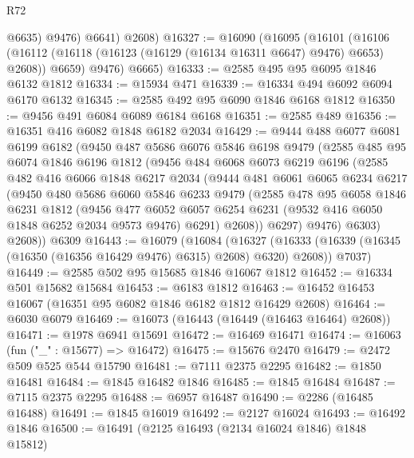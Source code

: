 \begin{lexlean}{R72}
\begin{coremodule}
            @6635)
          @9476)
        @6641)
      @2608)
@16327 := @16090
    (@16095
      (@16101
        (@16106 (@16112 (@16118 (@16123 (@16129 (@16134 @16311 @6647) @9476) @6653) @2608)) @6659)
        @9476)
      @6665)
@16333 := @2585 @495 @95 @6095 @1846 @6132 @1812
@16334 := @15934 @471
@16339 := @16334 @494 @6092 @6094 @6170 @6132
@16345 := @2585 @492 @95 @6090 @1846 @6168 @1812
@16350 := @9456 @491 @6084 @6089 @6184 @6168
@16351 := @2585 @489
@16356 := @16351 @416 @6082 @1848 @6182 @2034
@16429 := @9444
    @488
    @6077
    @6081
    @6199
    @6182
    (@9450
      @487
      @5686
      @6076
      @5846
      @6198
      @9479
      (@2585
        @485
        @95
        @6074
        @1846
        @6196
        @1812
        (@9456
          @484
          @6068
          @6073
          @6219
          @6196
          (@2585
            @482
            @416
            @6066
            @1848
            @6217
            @2034
            (@9444
              @481
              @6061
              @6065
              @6234
              @6217
              (@9450
                @480
                @5686
                @6060
                @5846
                @6233
                @9479
                (@2585
                  @478
                  @95
                  @6058
                  @1846
                  @6231
                  @1812
                  (@9456
                    @477
                    @6052
                    @6057
                    @6254
                    @6231
                    (@9532 @416 @6050 @1848 @6252 @2034 @9573 @9476)
                    @6291)
                  @2608))
              @6297)
            @9476)
          @6303)
        @2608))
    @6309
@16443 := @16079
    (@16084
      (@16327 (@16333 (@16339 (@16345 (@16350 (@16356 @16429 @9476) @6315) @2608) @6320) @2608))
      @7037)
@16449 := @2585 @502 @95 @15685 @1846 @16067 @1812
@16452 := @16334 @501 @15682 @15684
@16453 := @6183 @1812
@16463 := @16452 @16453 @16067 (@16351 @95 @6082 @1846 @6182 @1812 @16429 @2608)
@16464 := @6030 @6079
@16469 := @16073 (@16443 (@16449 (@16463 @16464) @2608))
@16471 := @1978 @6941 @15691
@16472 := @16469 @16471
@16474 := @16063 (fun ("_" : @15677) => @16472)
@16475 := @15676 @2470
@16479 := @2472 @509 @525 @544 @15790
@16481 := @7111 @2375 @2295
@16482 := @1850 @16481
@16484 := @1845 @16482 @1846
@16485 := @1845 @16484
@16487 := @7115 @2375 @2295
@16488 := @6957 @16487
@16490 := @2286 (@16485 @16488)
@16491 := @1845 @16019
@16492 := @2127 @16024
@16493 := @16492 @1846
@16500 := @16491 (@2125 @16493 (@2134 @16024 @1846) @1848 @15812)

\end{coremodule}
\end{lexlean}
